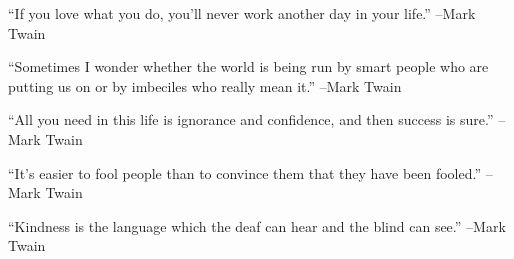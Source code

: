 \documentclass{article}%
\begin{document}
\linebreak%
\vspace{1mm}%
\begin{minipage}{\textwidth}%
\flushleft%
“If you love what you do, you'll never work another day in your life.”%
\linebreak%
\vspace{1mm}%
–Mark Twain%
\linebreak%
\vspace{1mm}%
\end{minipage}%
\linebreak%
\vspace{1mm}%
\begin{minipage}{\textwidth}%
\flushleft%
“Sometimes I wonder whether the world is being run by smart people who are putting us on or by imbeciles who really mean it.”%
\linebreak%
\vspace{1mm}%
–Mark Twain%
\linebreak%
\vspace{1mm}%
\end{minipage}%
\linebreak%
\vspace{1mm}%
\begin{minipage}{\textwidth}%
\flushleft%
“All you need in this life is ignorance and confidence, and then success is sure.”%
\linebreak%
\vspace{1mm}%
–Mark Twain%
\linebreak%
\vspace{1mm}%
\end{minipage}%
\linebreak%
\vspace{1mm}%
\begin{minipage}{\textwidth}%
\flushleft%
“It's easier to fool people than to convince them that they have been fooled.”%
\linebreak%
\vspace{1mm}%
–Mark Twain%
\linebreak%
\vspace{1mm}%
\end{minipage}%
\linebreak%
\vspace{1mm}%
\begin{minipage}{\textwidth}%
\flushleft%
“Kindness is the language which the deaf can hear and the blind can see.”%
\linebreak%
\vspace{1mm}%
–Mark Twain%
\linebreak%
\vspace{1mm}%
\end{minipage}%
\end{document}
